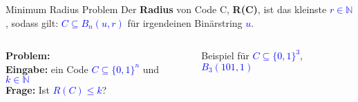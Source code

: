 \documentclass[10pt, aspectratio=169]{beamer}
\begin{document}
\begin{frame}{Minimum Radius Problem}
Der \alert{\textbf{Radius}} von Code C,  \textbf{R(C)}, ist das kleinste \textcolor{blue}{$r \in \mathbb{N}$}, sodass gilt: \textcolor{blue}{$C\subseteq B_n(u,r)$} für irgendeinen Binärstring \textcolor{blue}{$u$}.

\begin{columns}[T] %

    \begin{column}{0.35\textwidth}
        \vspace{2em}
        \textbf{\alert{Problem:}}\\
        \textbf{Eingabe:} ein Code  \textcolor{blue}{$C \subseteq \{0,1\}^n$} und \textcolor{blue}{$k \in \mathbb{N}$}\\
        \textbf{Frage:} Ist \textcolor{blue}{$R(C)\leq k$}?
    \end{column}
    \begin{column}{0.4\textwidth}
        \begin{figure}
            \caption{Beispiel für \textcolor{blue}{$C \subseteq \{0,1\}^3$}, \textcolor{blue}{$B_3(101,1)$}}
            
            \label{fig:example}
        \end{figure}
    \end{column}
\end{columns}
\end{frame}




\end{document}
